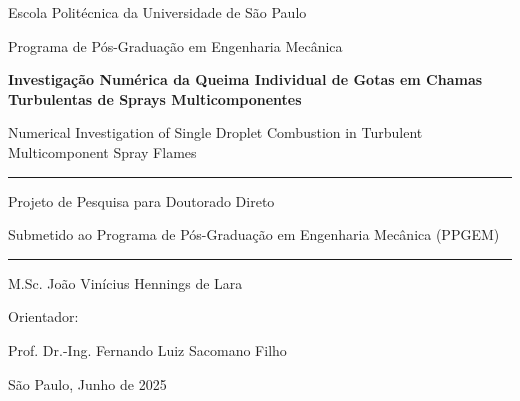 \begin{titlepage}
    \centering
    \large
    {
    Escola Politécnica da Universidade de São Paulo \par
    Programa de Pós-Graduação em Engenharia Mecânica
    \par}

    \vspace*{3.5cm}
    
    {\bfseries\Large %
    Investigação Numérica da Queima Individual de Gotas em Chamas Turbulentas de Sprays Multicomponentes\par}
    
    \vspace{1cm}

    {\Large %
    Numerical Investigation of Single Droplet Combustion in Turbulent Multicomponent Spray Flames\par}

    \vspace{2.5cm}

    \hrule
    \vspace{0.4cm}
    {
    Projeto de Pesquisa para Doutorado Direto\par
    Submetido ao Programa de Pós-Graduação em Engenharia Mecânica (PPGEM)
    }    
    \vspace{0.4cm}
    \hrule
    
    \vspace{3.5cm}
    {
    M.Sc. João Vinícius Hennings de Lara\par
    }
    
    \vspace{1.0cm}
    \begin{flushleft}
        Orientador:\\
    \end{flushleft}
    \vspace{-.3cm}
    {
    Prof. Dr.-Ing. Fernando Luiz Sacomano Filho
    }
    
    \vfill
    São Paulo, Junho de 2025

\end{titlepage}
